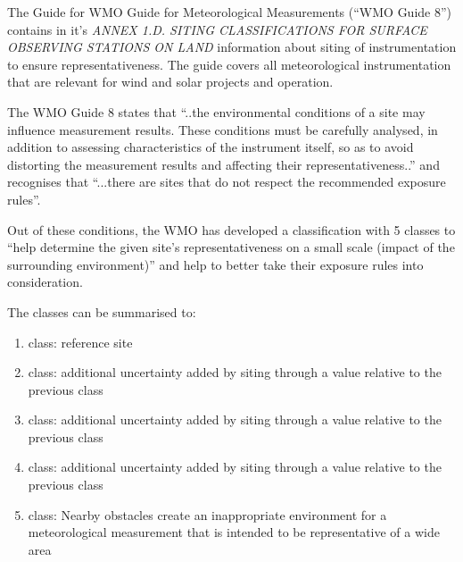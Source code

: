 {\color{magenta}{ Discuss location specifics regarding terrain differences etc.}}
{\color{magenta}{ comment SW 210715: I removed the title "location of instrumentation". I think it is much easier to write and to read if the following text is in the section location of measurements}}


The Guide for WMO Guide for Meteorological Measurements \cite{guidewmo2018} (``WMO Guide 8'') contains in it's \textit{ANNEX 1.D. SITING CLASSIFICATIONS FOR SURFACE OBSERVING STATIONS ON LAND} information about siting of instrumentation to ensure representativeness. The guide covers all meteorological instrumentation that are relevant for wind and solar projects and operation. 

The WMO Guide 8 states that ``..the environmental conditions of a site may influence measurement results. These conditions must be carefully analysed, in addition to assessing characteristics of the instrument itself, so as to avoid distorting the measurement results and affecting their representativeness..'' and recognises that ``...there are sites that do not respect the recommended exposure rules''. 

Out of these conditions, the WMO has developed a classification with 5 classes to ``help determine the given site’s representativeness on a small scale (impact of the surrounding environment)'' and help to better take their exposure rules into consideration. 

The classes can be summarised to:
\begin{enumerate}
    \vspace{-0.4}\item class: reference site
    \item class: additional uncertainty added by siting through a value relative to the previous class 
    \item class: additional uncertainty added by siting through a value relative to the previous class 
    \item class: additional uncertainty added by siting through a value relative to the previous class 
    \item class: Nearby obstacles create an inappropriate environment for a meteorological measurement that is intended to be representative of a wide area
\end{enumerate}


